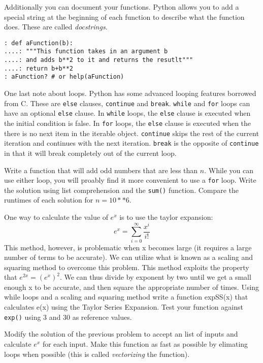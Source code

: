 Additionally you can document your functions. Python allows you to add a special string at the beginning of each function to describe what the function does.  These are called \emph{docstrings}.
\begin{lstlisting}
: def aFunction(b):
....: """This function takes in an argument b
....: and adds b**2 to it and returns the resutlt"""
....: return b+b**2
: aFunction? # or help(aFunction)
\end{lstlisting}

One last note about loops.  Python has some advanced looping features borrowed from C.  These are {\tt else} clauses, {\tt continue} and {\tt break}.  {\tt while} and {\tt for} loops can have an optional {\tt else} clause.  In {\tt while} loops, the {\tt else} clause is executed when the initial condition is false.  In {\tt for} loops, the {\tt else} clause is executed when the there is no next item in the iterable object.  {\tt continue} skips the rest of the current iteration and continues with the next iteration.  {\tt break} is the opposite of {\tt continue} in that it will break completely out of the current loop.

\begin{problem}
Write a function that will add odd numbers that are less than $n$. While you can use either loop, you will proably find it more convenient to use a {\tt for} loop. Write the solution using list comprehension and the {\tt sum()} function. Compare the runtimes of each solution for $n=10**6$.
\end{problem}



\begin{problem}
One way to calculate the value of $e^x$ is to use the taylor expansion:
\[
e^x = \sum_{i=0}^\infty{\frac{x^i}{i!}}
\]
This method, however, is problematic when x becomes large (it requires a large number of terms to be accurate). We can utilize what is known as a scaling and squaring method to overcome this problem. This method exploits the property that $e^{2x} = (e^x)^2$. We can thus divide by exponent by two until we get a small enough x to be accurate, and then square the appropriate number of times.
Using while loops and a scaling and squaring method write a function expSS(x) that calculates e(x) using the Taylor Series Expansion. Test your function against {\tt exp()} using $3$ and $30$ as reference values.
\end{problem}

\begin{problem}
Modify the solution of the previous problem to accept an list of inputs and calculate $e^x$ for each input. Make this function as fast as possible by elimating loops when possible (this is called \emph{vectorizing} the function).
\end{problem}